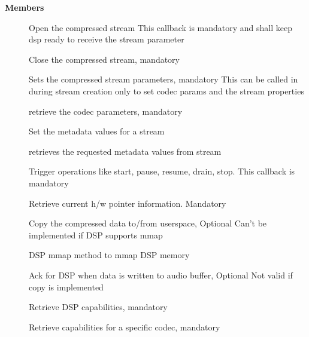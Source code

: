 \documentclass[a4paper,8pt,english]{sphinxmanual}
\begin{document}
\textbf{Members}
\begin{description}
\item[{}] \leavevmode
Open the compressed stream
This callback is mandatory and shall keep dsp ready to receive the stream
parameter

\item[{}] \leavevmode
Close the compressed stream, mandatory

\item[{}] \leavevmode
Sets the compressed stream parameters, mandatory
This can be called in during stream creation only to set codec params
and the stream properties

\item[{}] \leavevmode
retrieve the codec parameters, mandatory

\item[{}] \leavevmode
Set the metadata values for a stream

\item[{}] \leavevmode
retrieves the requested metadata values from stream

\item[{}] \leavevmode
Trigger operations like start, pause, resume, drain, stop.
This callback is mandatory

\item[{}] \leavevmode
Retrieve current h/w pointer information. Mandatory

\item[{}] \leavevmode
Copy the compressed data to/from userspace, Optional
Can't be implemented if DSP supports mmap

\item[{}] \leavevmode
DSP mmap method to mmap DSP memory

\item[{}] \leavevmode
Ack for DSP when data is written to audio buffer, Optional
Not valid if copy is implemented

\item[{}] \leavevmode
Retrieve DSP capabilities, mandatory

\item[{}] \leavevmode
Retrieve capabilities for a specific codec, mandatory

\end{description}
\end{document}

